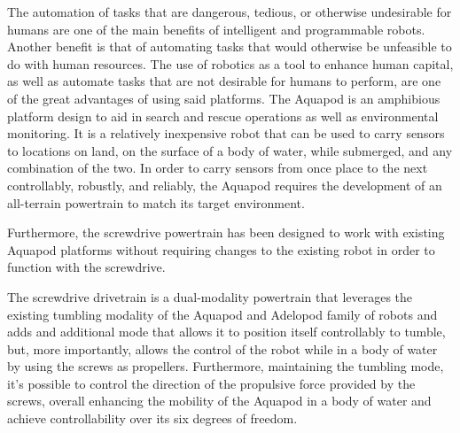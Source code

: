 
The automation of tasks that are dangerous, tedious, or otherwise undesirable
for humans are one of the main benefits of intelligent and programmable robots.
Another benefit is that of automating tasks that would otherwise be unfeasible
to do with human resources. The use of robotics as a tool to enhance human
capital, as well as automate tasks that are not desirable for humans to perform,
are one of the great advantages of using said platforms.
The Aquapod is an amphibious platform design to aid in search and rescue
operations as well as environmental monitoring. It is a relatively inexpensive
robot that can be used to carry sensors to locations on land, on the surface of
a body of water, while submerged, and any combination of the two. 
In order to carry sensors from once place to the next controllably, robustly,
and reliably, the Aquapod requires the development of an all-terrain powertrain
to match its target environment. 


Furthermore, the screwdrive powertrain has been designed to work with existing
Aquapod platforms without requiring changes to the existing robot in order to
function with the screwdrive. 

The screwdrive drivetrain is a dual-modality powertrain that leverages the
existing tumbling modality of the Aquapod and Adelopod family of robots and adds
and additional mode that allows it to position itself controllably to tumble,
but, more importantly, allows the control of the robot while in a body of water
by using the screws as propellers. Furthermore, maintaining the tumbling mode,
it's possible to control the direction of the propulsive force provided by the
screws, overall enhancing the mobility of the Aquapod in a body of water and
achieve controllability over its six degrees of freedom. 
